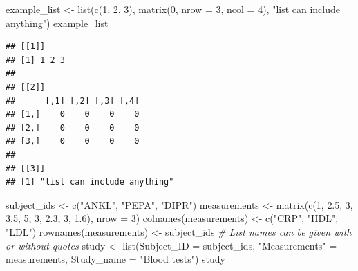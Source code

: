 \documentclass[
]{book}
\newenvironment{Shaded}{\begin{snugshade}}{\end{snugshade}}
\newcommand{\AttributeTok}[1]{\textcolor[rgb]{0.77,0.63,0.00}{#1}}
\newcommand{\CommentTok}[1]{\textcolor[rgb]{0.56,0.35,0.01}{\textit{#1}}}
\newcommand{\DecValTok}[1]{\textcolor[rgb]{0.00,0.00,0.81}{#1}}
\newcommand{\FloatTok}[1]{\textcolor[rgb]{0.00,0.00,0.81}{#1}}
\newcommand{\FunctionTok}[1]{\textcolor[rgb]{0.00,0.00,0.00}{#1}}
\newcommand{\NormalTok}[1]{#1}
\newcommand{\OtherTok}[1]{\textcolor[rgb]{0.56,0.35,0.01}{#1}}
\newcommand{\StringTok}[1]{\textcolor[rgb]{0.31,0.60,0.02}{#1}}
\begin{document}
\begin{Shaded}
\begin{Highlighting}[]
\NormalTok{example\_list }\OtherTok{\textless{}{-}} \FunctionTok{list}\NormalTok{(}\FunctionTok{c}\NormalTok{(}\DecValTok{1}\NormalTok{, }\DecValTok{2}\NormalTok{, }\DecValTok{3}\NormalTok{),}
                     \FunctionTok{matrix}\NormalTok{(}\DecValTok{0}\NormalTok{, }\AttributeTok{nrow =} \DecValTok{3}\NormalTok{, }\AttributeTok{ncol =} \DecValTok{4}\NormalTok{),}
                     \StringTok{"list can include anything"}\NormalTok{)}
\NormalTok{example\_list}
\end{Highlighting}
\end{Shaded}

\begin{verbatim}
## [[1]]
## [1] 1 2 3
## 
## [[2]]
##      [,1] [,2] [,3] [,4]
## [1,]    0    0    0    0
## [2,]    0    0    0    0
## [3,]    0    0    0    0
## 
## [[3]]
## [1] "list can include anything"
\end{verbatim}

\begin{Shaded}
\begin{Highlighting}[]
\NormalTok{subject\_ids }\OtherTok{\textless{}{-}} \FunctionTok{c}\NormalTok{(}\StringTok{"ANKL"}\NormalTok{, }\StringTok{"PEPA"}\NormalTok{, }\StringTok{"DIPR"}\NormalTok{)}
\NormalTok{measurements }\OtherTok{\textless{}{-}} \FunctionTok{matrix}\NormalTok{(}\FunctionTok{c}\NormalTok{(}\DecValTok{1}\NormalTok{, }\FloatTok{2.5}\NormalTok{, }\DecValTok{3}\NormalTok{,}
                         \FloatTok{3.5}\NormalTok{, }\DecValTok{5}\NormalTok{, }\DecValTok{3}\NormalTok{,}
                         \FloatTok{2.3}\NormalTok{, }\DecValTok{3}\NormalTok{, }\FloatTok{1.6}\NormalTok{),}
                       \AttributeTok{nrow =} \DecValTok{3}\NormalTok{)}
\FunctionTok{colnames}\NormalTok{(measurements) }\OtherTok{\textless{}{-}} \FunctionTok{c}\NormalTok{(}\StringTok{"CRP"}\NormalTok{, }\StringTok{"HDL"}\NormalTok{, }\StringTok{"LDL"}\NormalTok{)}
\FunctionTok{rownames}\NormalTok{(measurements) }\OtherTok{\textless{}{-}}\NormalTok{ subject\_ids}
\CommentTok{\# List names can be given with or without quotes}
\NormalTok{study }\OtherTok{\textless{}{-}} \FunctionTok{list}\NormalTok{(}\AttributeTok{Subject\_ID =}\NormalTok{ subject\_ids,}
              \StringTok{"Measurements"} \OtherTok{=}\NormalTok{ measurements,}
              \AttributeTok{Study\_name =} \StringTok{"Blood tests"}\NormalTok{)}
\NormalTok{study}
\end{Highlighting}
\end{Shaded}
\end{document}
